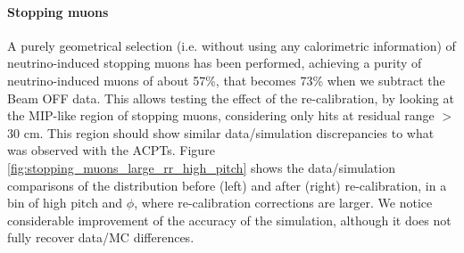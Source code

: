 \paragraph{Stopping muons}
A purely geometrical selection (i.e. without using any calorimetric information) of neutrino-induced stopping muons has been performed, achieving a purity of neutrino-induced muons of about 57\%, that becomes 73\% when we subtract the Beam OFF data.
This allows testing the effect of the re-calibration, by looking at the MIP-like region of stopping muons, considering only hits at residual range $>$ 30 cm.
This region should show similar data/simulation discrepancies to what was observed with the ACPTs.
Figure \ref{fig:stopping_muons_large_rr_high_pitch} shows the data/simulation comparisons of the \dqdx distribution before (left) and after (right) re-calibration, in a bin of high pitch and $\phi$, where re-calibration corrections are larger.
We notice considerable improvement of the accuracy of the simulation, although it does not fully recover data/MC differences.

